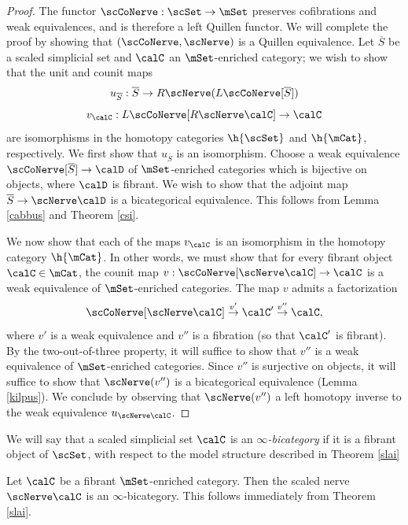 \begin{proof}
The functor $\scCoNerve: \scSet \rightarrow \mSet$ preserves cofibrations and weak equivalences, and is therefore a left Quillen functor. We will complete the proof by showing that
$(\scCoNerve, \scNerve)$ is a Quillen equivalence. Let $\overline{S}$ be a scaled simplicial set
and $\calC$ an $\mSet$-enriched category; we wish to show that the unit and counit maps
$$ u_{\overline{S}}: \overline{S} \rightarrow R \scNerve( L \scCoNerve[\overline{S}])$$
$$ v_{\calC}: L \scCoNerve[ R \scNerve \calC] \rightarrow \calC$$
are isomorphisms in the homotopy categories $\h{\scSet}$ and $\h{ \mCat}$, respectively.
We first show that $u_{ \overline{S}}$ is an isomorphism. Choose a weak equivalence
$\scCoNerve[ \overline{S} ] \rightarrow \calD$ of $\mSet$-enriched categories which is bijective on objects, where $\calD$ is fibrant. We wish to show that the adjoint map
$\overline{S} \rightarrow \scNerve \calD$ is a bicategorical equivalence. 
This follows from Lemma \ref{cabbus} and Theorem \ref{csi}.

We now show that each of the maps $v_{\calC}$ is an isomorphism in the homotopy category
$\h{ \mCat}$. In other words, we must show that for every fibrant object $\calC \in \mCat$, the
counit map $v: \scCoNerve[ \scNerve \calC] \rightarrow \calC$ is a weak equivalence of $\mSet$-enriched categories. The map $v$ admits a factorization
$$ \scCoNerve[ \scNerve \calC] \stackrel{v'}{\rightarrow} \calC' \stackrel{v''}{\rightarrow} \calC,$$
where $v'$ is a weak equivalence and $v''$ is a fibration (so that $\calC'$ is fibrant).
By the two-out-of-three property, it will suffice to show that $v''$ is a weak equivalence of
$\mSet$-enriched categories. Since $v''$ is surjective on objects, it will suffice to show that
$\scNerve(v'')$ is a bicategorical equivalence (Lemma \ref{kilpus}). We conclude by observing that $\scNerve(v'')$ a left homotopy inverse to the weak equivalence $u_{ \scNerve \calC}$.
\end{proof}

\begin{definition}
We will say that a scaled simplicial set $\calC$ is an {\it $\infty$-bicategory} if it is a fibrant object of
$\scSet$, with respect to the model structure described in Theorem \ref{slai}
\end{definition}

\begin{remark}\label{coslai}
Let $\calC$ be a fibrant $\mSet$-enriched category. Then the scaled nerve
$\scNerve \calC$ is an $\infty$-bicategory. This follows immediately from Theorem \ref{slai}.
\end{remark}

